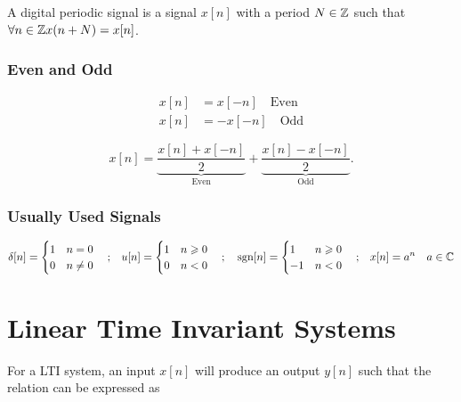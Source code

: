 \documentclass{report}
\DeclareMathOperator{\sgn}{sgn}
\begin{document}
A digital periodic signal is a signal $x[n]$ with a period $N\in\ZZ$ such that $\forall n\in\ZZ x(n+N)=x[n]$.


\subsubsection{Even and Odd}

\begin{align*}
	x[n] & = x[-n] \quad \text{Even} \\
	x[n] & = -x[-n] \quad \text{Odd}
\end{align*}

\[
	x[n] = \underbrace{\frac{x[n] + x[-n]}{2}}_{\text{Even}} + \underbrace{\frac{x[n] - x[-n]}{2}}_{\text{Odd}}
	.\]

\subsubsection{Usually Used Signals}

\[
	\delta[n] = \begin{cases}
		1 & n = 0    \\
		0 & n \neq 0
	\end{cases}      \qq{;}
	u[n] = \begin{cases}
		1 & n \geq 0 \\
		0 & n < 0
	\end{cases}   \qq{;}
	\sgn[n] = \begin{cases}
		1  & n \geq 0 \\
		-1 & n < 0
	\end{cases}     \qq{;}
	x[n] = a^n \quad a\in\CC
\]

\section{Linear Time Invariant Systems}

For a LTI system, an input $x[n]$ will produce an output $y[n]$ such that the relation can be expressed as
\end{document}
